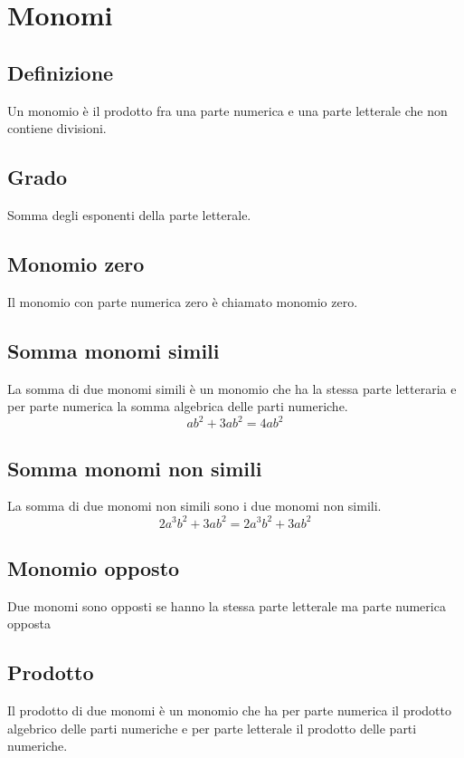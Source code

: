 \chapter{Monomi}
\section{Definizione}
Un monomio è il prodotto fra una parte numerica e una parte letterale che non contiene divisioni.
\section{Grado} 
Somma degli esponenti della parte letterale.
\section{Monomio zero}
Il monomio con parte numerica zero è chiamato monomio zero.
\section{Somma monomi simili}
La somma di due monomi simili è un monomio che ha la stessa parte letteraria e per parte numerica la somma algebrica delle parti numeriche.
\begin{equation}
ab^2+3ab^2=4ab^2
\end{equation}
\section{Somma monomi non simili}
La somma di due monomi non simili  sono i due monomi non simili.
\begin{equation}
2a^3b^2+3ab^2=2a^3b^2+3ab^2
\end{equation}
\section{Monomio opposto}
Due monomi sono opposti se hanno la stessa parte letterale ma parte numerica opposta
\section{Prodotto}
Il prodotto di due monomi è un monomio che ha per parte numerica il prodotto algebrico delle parti numeriche e per parte letterale il prodotto delle parti numeriche.